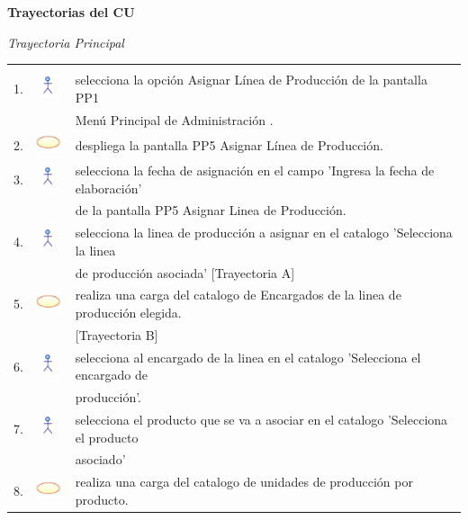 \documentclass[10pt,spanish]{article}
\providecommand{\tabularnewline}{\\}
\begin{document}
	\newpage
	\textbf{\large Trayectorias del CU}{\large \par}
	\textit{\large Trayectoria Principal}{\large{} }{\large \par}
	\begin{tabular}{ccl}
	 &  & \tabularnewline
	1. & \includegraphics{actor} & selecciona la opción Asignar Línea de Producción de la pantalla PP1\tabularnewline	
    & & Menú Principal de Administración .\tabularnewline	
	2. & \includegraphics{sistema} & despliega la pantalla PP5 Asignar Línea de Producción.\tabularnewline			 	 	 
	3. & \includegraphics{actor} & selecciona la fecha de asignación en el campo 'Ingresa la fecha de elaboración'\tabularnewline
	& &   de la pantalla PP5 Asignar Linea de Producción. \tabularnewline
	4. & \includegraphics{actor} & selecciona la linea de producción a asignar en el catalogo 'Selecciona la linea\tabularnewline 
	& &  de producción asociada' [Trayectoria A] \tabularnewline
	5. & \includegraphics{sistema} & realiza una carga del catalogo de Encargados de la linea de producción elegida.\tabularnewline
	& & [Trayectoria B]\tabularnewline
	6. & \includegraphics{actor} & selecciona al encargado de la linea en el catalogo 'Selecciona el encargado de\tabularnewline
	& &  producción'.\tabularnewline		
	7. & \includegraphics{actor} & selecciona el producto que se va a asociar en el catalogo 'Selecciona el producto\tabularnewline
	& &  asociado' \tabularnewline
	8. & \includegraphics{sistema} & realiza una carga del catalogo de unidades de producción por producto.\tabularnewline

\end{tabular}
\end{document}
